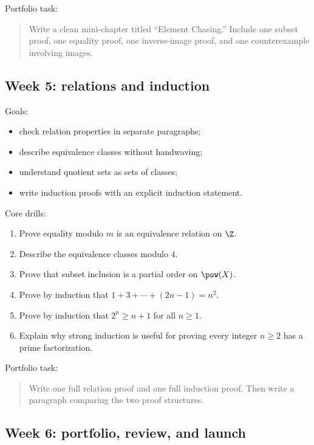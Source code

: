 Portfolio task:

\begin{quote}
Write a clean mini-chapter titled ``Element Chasing.'' Include one subset proof, one equality proof, one inverse-image proof, and one counterexample involving images.
\end{quote}

\subsection{Week 5: relations and induction}

Goals:

\begin{itemize}
\item check relation properties in separate paragraphs;
\item describe equivalence classes without handwaving;
\item understand quotient sets as sets of classes;
\item write induction proofs with an explicit induction statement.
\end{itemize}

Core drills:

\begin{enumerate}
\item Prove equality modulo $m$ is an equivalence relation on $\Z$.
\item Describe the equivalence classes modulo $4$.
\item Prove that subset inclusion is a partial order on $\pow(X)$.
\item Prove by induction that $1+3+\cdots+(2n-1)=n^2$.
\item Prove by induction that $2^n\geq n+1$ for all $n\geq1$.
\item Explain why strong induction is useful for proving every integer $n\geq2$ has a prime factorization.
\end{enumerate}

Portfolio task:

\begin{quote}
Write one full relation proof and one full induction proof. Then write a paragraph comparing the two proof structures.
\end{quote}

\subsection{Week 6: portfolio, review, and launch}

